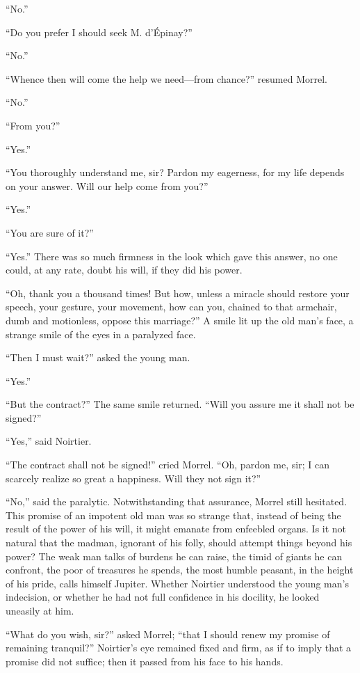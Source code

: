 “No.”

“Do you prefer I should seek M. d’Épinay?”

“No.”

“Whence then will come the help we need—from chance?” resumed Morrel.

“No.”

“From you?”

“Yes.”

“You thoroughly understand me, sir? Pardon my eagerness, for my life
depends on your answer. Will our help come from you?”

“Yes.”

“You are sure of it?”

“Yes.” There was so much firmness in the look which gave this answer,
no one could, at any rate, doubt his will, if they did his power.

“Oh, thank you a thousand times! But how, unless a miracle should
restore your speech, your gesture, your movement, how can you, chained
to that armchair, dumb and motionless, oppose this marriage?” A smile
lit up the old man’s face, a strange smile of the eyes in a paralyzed
face.

“Then I must wait?” asked the young man.

“Yes.”

“But the contract?” The same smile returned. “Will you assure me it
shall not be signed?”

“Yes,” said Noirtier.

“The contract shall not be signed!” cried Morrel. “Oh, pardon me, sir;
I can scarcely realize so great a happiness. Will they not sign it?”

“No,” said the paralytic. Notwithstanding that assurance, Morrel still
hesitated. This promise of an impotent old man was so strange that,
instead of being the result of the power of his will, it might emanate
from enfeebled organs. Is it not natural that the madman, ignorant of
his folly, should attempt things beyond his power? The weak man talks
of burdens he can raise, the timid of giants he can confront, the poor
of treasures he spends, the most humble peasant, in the height of his
pride, calls himself Jupiter. Whether Noirtier understood the young
man’s indecision, or whether he had not full confidence in his
docility, he looked uneasily at him.

“What do you wish, sir?” asked Morrel; “that I should renew my promise
of remaining tranquil?” Noirtier’s eye remained fixed and firm, as if
to imply that a promise did not suffice; then it passed from his face
to his hands.

